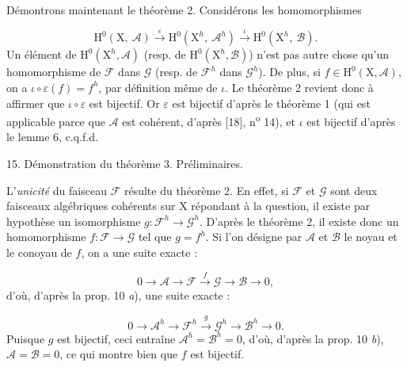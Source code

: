 
Démontrons maintenant le théorème 2. Considérons les homomorphismes

\begin{equation*}
\mathrm{H}^0(\mathrm{X},\ \mathcal{A}) \xrightarrow{\varepsilon} \mathrm{H}^0(\mathrm{X}^h,\ \mathcal{A}^h) \xrightarrow{\iota} \mathrm{H}^0(\mathrm{X}^h,\ \mathcal{B}).
\end{equation*}
Un élément de $\mathrm{H}^0(\mathrm{X}^h, \mathcal{A})$ (resp. de $\mathrm{H}^0(\mathrm{X}^h, \mathcal{B})$) n'est pas autre chose qu'un homomorphisme de $\mathcal{F}$ dans $\mathcal{G}$ (resp. de $\mathcal{F}^h$ dans $\mathcal{G}^h$). De plus, si $f \in \mathrm{H}^0(\mathrm{X}, \mathcal{A})$, on a $\iota \circ \varepsilon(f) = f^h$, par définition même de $\iota$. Le théorème 2 revient donc à affirmer que $\iota \circ \varepsilon$ est bijectif. Or $\varepsilon$ est bijectif d'après le théorème 1 (qui est applicable parce que $\mathcal{A}$ est cohérent, d'après [18], n\textsuperscript{o} 14), et $\iota$ est bijectif d'après le lemme 6, c.q.f.d.


15. Démonstration du théorème 3. Préliminaires.

L'\textit{unicité} du faisceau $\mathcal{F}$ résulte du théorème 2. En effet, si $\mathcal{F}$ et $\mathcal{G}$ sont deux faisceaux algébriques cohérents sur $\mathrm{X}$ répondant à la question, il existe par hypothèse un isomorphisme $g : \mathcal{F}^h \to \mathcal{G}^h$. D'après le théorème 2, il existe donc un homomorphisme $f : \mathcal{F} \to \mathcal{G}$ tel que $g = f^h$. Si l'on désigne par $\mathcal{A}$ et $\mathcal{B}$ le noyau et le conoyau de $f$, on a une suite exacte :

\begin{equation*}
0 \to \mathcal{A} \to \mathcal{F} \xrightarrow{f} \mathcal{G} \to \mathcal{B} \to 0,
\end{equation*}
d'où, d'après la prop. 10 \textit{a}), une suite exacte :

\begin{equation*}
0 \to \mathcal{A}^h \to \mathcal{F}^h \xrightarrow{g} \mathcal{G}^h \to \mathcal{B}^h \to 0.
\end{equation*}
Puisque $g$ est bijectif, ceci entraîne $\mathcal{A}^h = \mathcal{B}^h = 0$, d'où, d'après la prop. 10 \textit{b}), $\mathcal{A} = \mathcal{B} = 0$, ce qui montre bien que $f$ est bijectif.

